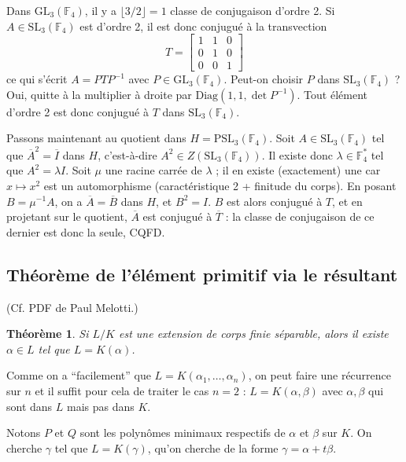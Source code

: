 \documentclass[a4paper, 11pt]{article}
\def\F{\mathbb{F}}
\def\GL{\mathrm{GL}}
\def\SL{\mathrm{SL}}
\def\PSL{\mathrm{PSL}}
\def\Diag{\mathrm{Diag}}
\newtheorem*{theorem}{Théorème}
\begin{document}
Dans $\GL_3(\F_4)$, il y a $\lfloor 3/2 \rfloor = 1$ classe de conjugaison
d'ordre 2. Si $A \in \SL_3(\F_4)$ est d'ordre 2, il est donc conjugué à la
transvection
\[ T = \left[\begin{matrix}
      1 & 1 & 0 \\
      0 & 1 & 0 \\
      0 & 0 & 1
    \end{matrix}\right] \]
ce qui s'écrit $A = PTP^{-1}$ avec $P \in \GL_3(\F_4)$. Peut-on choisir $P$ dans
$\SL_3(\F_4)$ ? Oui, quitte à la multiplier à droite par $\Diag(1,1,\det
P^{-1})$. Tout élément d'ordre 2 est donc conjugué à $T$ dans $\SL_3(\F_4)$.

Passons maintenant au quotient dans $H = \PSL_3(\F_4)$. Soit $A \in \SL_3(\F_4)$
tel que $\overline{A}^2 = \overline{I}$ dans $H$, c'est-à-dire $A^2 \in
Z(\SL_3(\F_4))$. Il existe donc $\lambda \in \F_4^*$ tel que $A^2 = \lambda I$.
Soit $\mu$ une racine carrée de $\lambda$ ; il en existe (exactement) une car $x
\mapsto x^2$ est un automorphisme (caractéristique 2 + finitude du corps). En
posant $B = \mu^{-1}A$, on a $\overline{A} = \overline{B}$ dans $H$, et $B^2 =
I$. $B$ est alors conjugué à $T$, et en projetant sur le quotient,
$\overline{A}$ est conjugué à $\overline{T}$ : la classe de conjugaison de ce
dernier est donc la seule, CQFD.

\newpage

\subsection{Théorème de l'élément primitif via le résultant}

(Cf. PDF de Paul Melotti.)

\begin{theorem}
  Si $L/K$ est une extension de corps finie séparable, alors il existe $\alpha
  \in L$ tel que $L = K(\alpha)$.
\end{theorem}

Comme on a \enquote{facilement} que $L = K(\alpha_1, \ldots, \alpha_n)$, on peut
faire une récurrence sur $n$ et il suffit pour cela de traiter le cas $n = 2$ :
$L = K(\alpha,\beta)$ avec $\alpha, \beta$ qui sont dans $L$ mais pas dans $K$.

Notons $P$ et $Q$ sont les polynômes minimaux respectifs de $\alpha$ et $\beta$
sur $K$. On cherche $\gamma$ tel que $L = K(\gamma)$, qu'on cherche de la forme
$\gamma = \alpha + t\beta$.

\newpage
\end{document}
